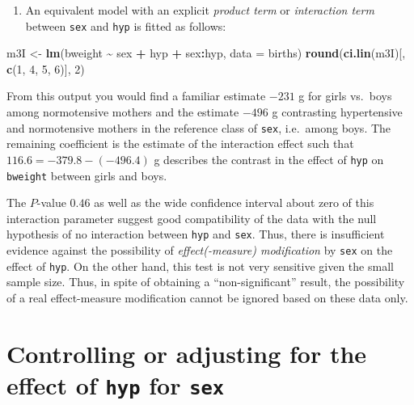\documentclass[
]{book}
\newenvironment{Shaded}{\begin{snugshade}}{\end{snugshade}}
\newcommand{\AttributeTok}[1]{\textcolor[rgb]{0.13,0.29,0.53}{#1}}
\newcommand{\DecValTok}[1]{\textcolor[rgb]{0.00,0.00,0.81}{#1}}
\newcommand{\FunctionTok}[1]{\textcolor[rgb]{0.13,0.29,0.53}{\textbf{#1}}}
\newcommand{\NormalTok}[1]{#1}
\newcommand{\OtherTok}[1]{\textcolor[rgb]{0.56,0.35,0.01}{#1}}
\newcommand{\SpecialCharTok}[1]{\textcolor[rgb]{0.81,0.36,0.00}{\textbf{#1}}}
\providecommand{\tightlist}{%
  \setlength{\itemsep}{0pt}\setlength{\parskip}{0pt}}
\begin{document}
\begin{enumerate}
\def\labelenumi{\arabic{enumi}.}
\setcounter{enumi}{2}
\tightlist
\item
  An equivalent model with an explicit \emph{product term} or
  \emph{interaction term} between \texttt{sex} and \texttt{hyp} is
  fitted as follows:
\end{enumerate}

\begin{Shaded}
\begin{Highlighting}[]
\NormalTok{m3I }\OtherTok{\textless{}{-}} \FunctionTok{lm}\NormalTok{(bweight }\SpecialCharTok{\textasciitilde{}}\NormalTok{ sex }\SpecialCharTok{+}\NormalTok{ hyp }\SpecialCharTok{+}\NormalTok{ sex}\SpecialCharTok{:}\NormalTok{hyp, }\AttributeTok{data =}\NormalTok{ births)}
\FunctionTok{round}\NormalTok{(}\FunctionTok{ci.lin}\NormalTok{(m3I)[, }\FunctionTok{c}\NormalTok{(}\DecValTok{1}\NormalTok{, }\DecValTok{4}\NormalTok{, }\DecValTok{5}\NormalTok{, }\DecValTok{6}\NormalTok{)], }\DecValTok{2}\NormalTok{)}
\end{Highlighting}
\end{Shaded}

From this output you would find a familiar estimate \(-231\) g for girls
vs.~boys among normotensive mothers and the estimate \(-496\) g
contrasting hypertensive and normotensive mothers in the
reference class of \texttt{sex}, i.e.~among boys.
The remaining coefficient is the estimate of the interaction
effect such that \(116.6 = -379.8 -(-496.4)\) g
describes the contrast in the effect of \texttt{hyp} on \texttt{bweight}
between girls and boys.

The \(P\)-value \(0.46\) as well
as the wide confidence interval about zero of this interaction
parameter suggest good compatibility of the data with
the null hypothesis of
no interaction between \texttt{hyp} and \texttt{sex}. Thus,
there is insufficient evidence against
the possibility of \emph{effect(-measure) modification} by
\texttt{sex} on the effect of \texttt{hyp}.
On the other hand, this test is not very sensitive given
the small sample size. Thus, in spite of obtaining a ``non-significant''
result, the possibility of a real effect-measure modification
cannot be ignored based on these data only.

\section{\texorpdfstring{Controlling or adjusting for the effect of \texttt{hyp} for \texttt{sex}}{Controlling or adjusting for the effect of hyp for sex}}\label{controlling-or-adjusting-for-the-effect-of-hyp-for-sex}
\end{document}
